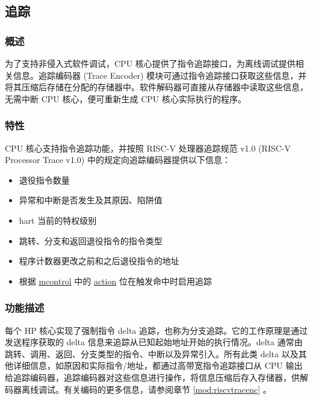 \documentclass[main\_\_CN.tex]{subfiles}
\begin{document}



\newpage
\subsection{追踪}
\label{sec:riscvcpu-trace}

\subsubsection{概述}
\label{sec:riscvcpu-trace-overview}
为了支持非侵入式软件调试，CPU 核心提供了指令追踪接口，为离线调试提供相关信息。追踪编码器 (Trace Encoder) 模块可通过指令追踪接口获取这些信息，并将其压缩后存储在分配的存储器中。软件解码器可直接从存储器中读取这些信息，无需中断 CPU 核心，便可重新生成 CPU 核心实际执行的程序。


\subsubsection{特性}
\label{sec:riscvcpu-trace-features}

CPU 核心支持指令追踪功能，并按照 RISC-V 处理器追踪规范 v1.0 (RISC-V Processor Trace v1.0) 中的规定向追踪编码器提供以下信息：

\begin{itemize}
    \item 退役指令数量
    \item 异常和中断是否发生及其原因、陷阱值
    \item hart 当前的特权级别
    \item 跳转、分支和返回退役指令的指令类型
    \item 程序计数器更改之前和之后退役指令的地址
    \item 根据 \hyperref[regdesc:MCONTROL]{mcontrol} 中的 \hyperref[regdesc:MCONTROL]{action} 位在触发命中时启用追踪
\end{itemize}


\subsubsection{功能描述}
\label{sec:riscvcpu-trace-func-descr}

每个 HP 核心实现了强制指令 delta 追踪，也称为分支追踪。它的工作原理是通过发送程序获取的 delta 信息来追踪从已知起始地址开始的执行情况。delta 通常由跳转、调用、返回、分支类型的指令、中断以及异常引入。所有此类 delta 以及其他详细信息，如原因和实际指令/地址，都通过高带宽指令追踪接口从 CPU 输出给追踪编码器，追踪编码器对这些信息进行操作，将信息压缩后存入存储器，供解码器离线调试。有关编码的更多信息，请参阅章节 \ref{mod:riscvtracenc} \textit{}。
\end{document}
